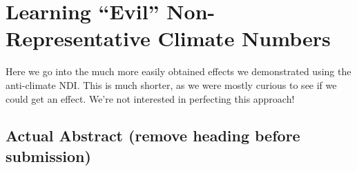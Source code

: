 \graphicspath{{evil-ndi/}}

\chapter{Learning ``Evil'' Non-Representative Climate Numbers}
\label{chap:evilndi}

Here we go into the much more easily obtained effects we demonstrated using the
anti-climate NDI. This is much shorter, as we were mostly curious to see if we
could get an effect. We're not interested in perfecting this approach!

\section{Actual Abstract (remove heading before submission)}
